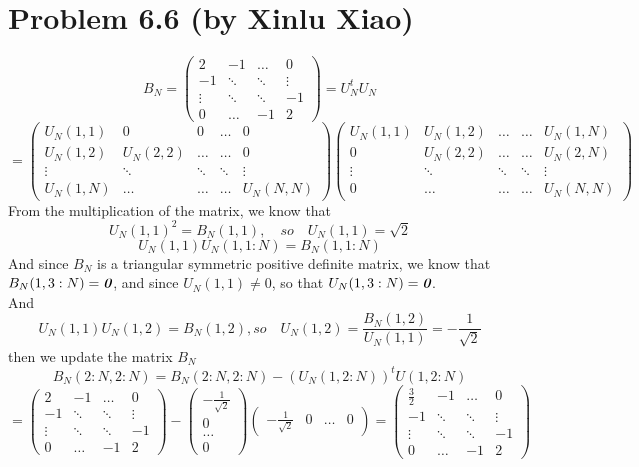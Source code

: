 \documentclass{article}
\DeclareMathOperator{\1}{\mathit{1}}
\numberwithin{figure}{section} %
\numberwithin{table}{section}
\begin{document}
\section{Problem 6.6 (by Xinlu Xiao)}
\[
B_{N} = \left(
\begin{matrix}
2 & -1 & \dots & 0 \\
-1 & \ddots & \ddots & \vdots\\
\vdots & \ddots & \ddots & -1\\
0 & \dots & -1 & 2
\end{matrix} \right) = U_{N}^{t}U_{N}\]
\[= 
\left(
\begin{matrix}
U_{N}(1,1) & 0 & 0 & \dots & 0\\
U_{N}(1,2) & U_{N}(2,2) & \dots & \dots & 0\\
\vdots & \ddots & \ddots & \ddots & \vdots\\
U_{N}(1,N) & \dots & \dots & \dots & U_{N}(N,N)
\end{matrix} \right) 
\left(
\begin{matrix}
U_{N}(1,1) & U_{N}(1,2) & \dots & \dots & U_{N}(1,N)\\
0 & U_{N}(2,2) & \dots & \dots & U_{N}(2,N)\\
\vdots & \ddots & \ddots & \ddots & \vdots\\
0 & \dots & \dots & \dots & U_{N}(N,N)
\end{matrix}\right)
\]
From the multiplication of the matrix, we know that 
\[
U_{N}(1,1)^2 = B_{N}(1,1), \quad so \quad U_{N}(1,1) = \sqrt{2}\]
\[
U_{N}(1,1)U_{N}(1,1:N) = B_{N}(1,1:N)\]
And since $B_{N}$ is a triangular symmetric positive definite matrix, we know that $B_{N}(1,3:N) = \emph{\textbf{0}}$, and since $U_{N}(1,1) \neq 0$, so that $U_{N}(1,3:N) = \emph{\textbf{0}}$.\\
And 
\[
U_{N}(1,1)U_{N}(1,2) = B_{N}(1,2), so \quad U_{N}(1,2) = \frac{B_{N}(1,2)}{U_{N}(1,1)} = -\frac{1}{\sqrt{2}}\]
then we update the matrix $B_{N}$
\[
B_{N}(2:N,2:N) = B_{N}(2:N,2:N)-(U_{N}(1,2:N))^{t}U(1,2:N) \]
\[
=
\left(
\begin{matrix}
2 & -1 & \dots & 0 \\
-1 & \ddots & \ddots & \vdots\\
\vdots & \ddots & \ddots & -1\\
0 & \dots & -1 & 2
\end{matrix} \right) - 
\left(
\begin{matrix}
-\frac{1}{\sqrt{2}}\\
0\\
\dots\\
0
\end{matrix} \right)
\left(
\begin{matrix}
 -\frac{1}{\sqrt{2}}&0&\dots&0
\end{matrix}\right)=
\left(
\begin{matrix}
\frac{3}{2} & -1 & \dots & 0 \\
-1 & \ddots & \ddots & \vdots\\
\vdots & \ddots & \ddots & -1\\
0 & \dots & -1 & 2
\end{matrix} \right)\]
\end{document}

